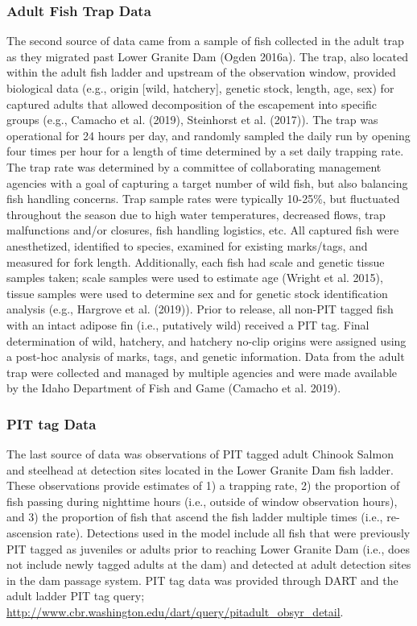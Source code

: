 \documentclass[
  12pt,
]{article}
\begin{document}
\hypertarget{adult-fish-trap-data}{%
\subsubsection{Adult Fish Trap Data}\label{adult-fish-trap-data}}

The second source of data came from a sample of fish collected in the adult trap as they migrated past Lower Granite Dam (Ogden 2016a). The trap, also located within the adult fish ladder and upstream of the observation window, provided biological data (e.g., origin {[}wild, hatchery{]}, genetic stock, length, age, sex) for captured adults that allowed decomposition of the escapement into specific groups (e.g., Camacho et al. (2019), Steinhorst et al. (2017)). The trap was operational for 24 hours per day, and randomly sampled the daily run by opening four times per hour for a length of time determined by a set daily trapping rate. The trap rate was determined by a committee of collaborating management agencies with a goal of capturing a target number of wild fish, but also balancing fish handling concerns. Trap sample rates were typically 10-25\%, but fluctuated throughout the season due to high water temperatures, decreased flows, trap malfunctions and/or closures, fish handling logistics, etc. All captured fish were anesthetized, identified to species, examined for existing marks/tags, and measured for fork length. Additionally, each fish had scale and genetic tissue samples taken; scale samples were used to estimate age (Wright et al. 2015), tissue samples were used to determine sex and for genetic stock identification analysis (e.g., Hargrove et al. (2019)). Prior to release, all non-PIT tagged fish with an intact adipose fin (i.e., putatively wild) received a PIT tag. Final determination of wild, hatchery, and hatchery no-clip origins were assigned using a post-hoc analysis of marks, tags, and genetic information. Data from the adult trap were collected and managed by multiple agencies and were made available by the Idaho Department of Fish and Game (Camacho et al. 2019).

\hypertarget{pit-tag-data}{%
\subsubsection{PIT tag Data}\label{pit-tag-data}}

The last source of data was observations of PIT tagged adult Chinook Salmon and steelhead at detection sites located in the Lower Granite Dam fish ladder. These observations provide estimates of 1) a trapping rate, 2) the proportion of fish passing during nighttime hours (i.e., outside of window observation hours), and 3) the proportion of fish that ascend the fish ladder multiple times (i.e., re-ascension rate). Detections used in the model include all fish that were previously PIT tagged as juveniles or adults prior to reaching Lower Granite Dam (i.e., does not include newly tagged adults at the dam) and detected at adult detection sites in the dam passage system. PIT tag data was provided through DART and the adult ladder PIT tag query; \url{http://www.cbr.washington.edu/dart/query/pitadult_obsyr_detail}.
\end{document}

